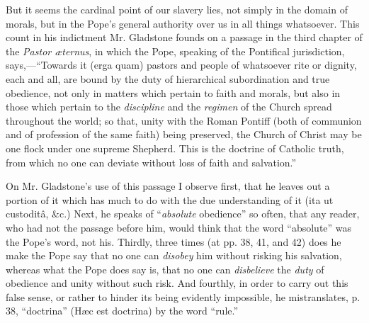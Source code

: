 But it seems the cardinal point of our slavery lies, not simply in
the domain of morals, but in the Pope's general authority over us
in all things whatsoever. This count in his indictment Mr. Gladstone
founds on a passage in the third chapter of the \emph{Pastor æternus},
in which the Pope, speaking of the Pontifical jurisdiction, says,—``Towards
it (erga quam) pastors and people of whatsoever rite or dignity, each
and all, are bound by the duty of hierarchical subordination and true
obedience, not only in matters which pertain to faith and morals, but
also in those which pertain to the \emph{discipline} and the \emph{regimen}
of the Church spread throughout the world; so that, unity with the Roman
Pontiff (both of communion and of profession of the same faith) being
preserved, the Church of Christ may be one flock under one supreme
Shepherd. This is the doctrine of Catholic truth, from which no one can
deviate without loss of faith and salvation.''

On Mr. Gladstone's use of this passage I observe first, that he
leaves out a portion of it which has much to do with the due
understanding of it (ita ut custoditâ, \&c.) Next, he speaks of
``\emph{absolute} obedience'' so often, that any reader, who had
not the passage before him, would think that the word
``absolute'' was the Pope's word, not his. Thirdly, three times
(at pp. 38, 41, and 42) does he make the Pope say that no one can \emph{disobey}
him without risking his salvation, whereas what the Pope does say is,
that no one can \emph{disbelieve} the \emph{duty} of obedience and unity
without such risk. And fourthly, in order to carry out this false sense,
or rather to hinder its being evidently impossible, he mistranslates, p.
38, ``doctrina'' (Hæc est doctrina) by the word
``rule.''

